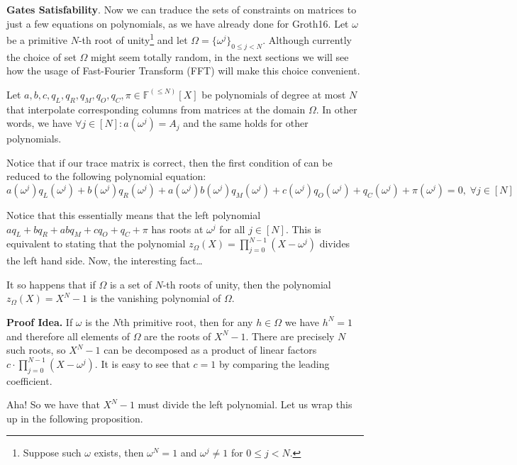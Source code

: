 \documentclass[../lecture-notes.tex]{subfiles}
\begin{document}
\textcolor{blue!80!black}{\textbf{Gates Satisfability}.} Now we can traduce the
sets of constraints on matrices to just a few equations on polynomials, as we
have already done for Groth16. Let $\omega$ be a primitive $N$-th root of
unity\footnote{Suppose such $\omega$ exists, then $\omega^N = 1$ and $\omega^j
\neq 1$ for $0 \le j < N$.} and let $\Omega = \{\omega^j\}_{0 \le j < N}$.
Although currently the choice of set $\Omega$ might seem totally random, in the
next sections we will see how the usage of Fast-Fourier Transform (FFT) will
make this choice convenient.

Let $a, b, c, q_L, q_R, q_M, q_O, q_C, \pi \in \mathbb{F}^{(\leq N)}[X]$ be
polynomials of degree at most $N$ that interpolate corresponding columns from
matrices at the domain $\Omega$. In other words, we have \(\forall j \in [N]:
a(\omega^j) = A_j\) and the same holds for other polynomials.

Notice that if our trace matrix is correct, then the first condition of
 can be reduced to the following polynomial
equation:
\begin{equation*}
    a(\omega^j)q_L(\omega^j) + b(\omega^j)q_R(\omega^j) + a(\omega^j)b(\omega^j)q_M(\omega^j) + c(\omega^j)q_O(\omega^j) + q_C(\omega^j) + \pi(\omega^j) = 0, \; \forall j \in [N]
\end{equation*}

Notice that this essentially means that the left polynomial $aq_L + bq_R + abq_M
+ cq_O + q_C + \pi$ has roots at $\omega^j$ for all $j \in [N]$. This is
equivalent to stating that the polynomial $z_{\Omega}(X) =
\prod_{j=0}^{N-1}(X-\omega^j)$ divides the left hand side. Now, the interesting
fact\dots

\begin{lemma}
    It so happens that if $\Omega$ is a set of $N$-th roots of unity, then the
    polynomial $z_{\Omega}(X) = X^N - 1$ is the vanishing polynomial of $\Omega$.
\end{lemma}

\textbf{Proof Idea.} If $\omega$ is the $N$th primitive root, then for any $h
\in \Omega$ we have $h^N = 1$ and therefore all elements of $\Omega$ are the
roots of $X^N-1$. There are precisely $N$ such roots, so $X^N-1$ can be 
decomposed as a product of linear factors $c \cdot \prod_{j=0}^{N-1}(X-\omega^j)$. 
It is easy to see that $c=1$ by comparing the leading coefficient. 

\vspace{5px}
Aha! So we have that $X^N-1$ must divide the left polynomial. Let us wrap this up 
in the following proposition.
\end{document}
